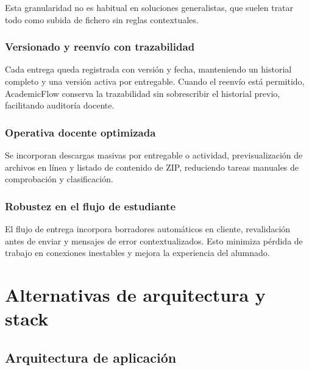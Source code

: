 \makeatletter
{}
\makeatother

Esta granularidad no es habitual en soluciones generalistas,
que suelen tratar todo como subida de fichero sin reglas contextuales.

\subsubsection*{Versionado y reenv\'io con trazabilidad}

Cada entrega queda registrada con versi\'on y fecha, manteniendo un
historial completo y una versi\'on activa por entregable.
Cuando el reenv\'io est\'a permitido, AcademicFlow conserva la trazabilidad
sin sobrescribir el historial previo, facilitando auditor\'ia docente.

\subsubsection*{Operativa docente optimizada}

Se incorporan descargas masivas por entregable o actividad,
previsualizaci\'on de archivos en l\'inea y listado de contenido
de ZIP, reduciendo tareas manuales de comprobaci\'on y clasificaci\'on.

\subsubsection*{Robustez en el flujo de estudiante}

El flujo de entrega incorpora borradores autom\'aticos en cliente,
revalidaci\'on antes de enviar y mensajes de error contextualizados.
Esto minimiza p\'erdida de trabajo en conexiones inestables
y mejora la experiencia del alumnado.

\FloatBarrier
\section{Alternativas de arquitectura y stack}

\subsection{Arquitectura de aplicaci\'on}

